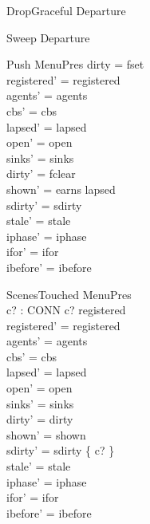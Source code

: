 \documentclass[a4paper,10pt,fleqn]{article}
\begin{document}
\begin{zed}
  DropGraceful  Departure
\end{zed}

\begin{zed}
  Sweep  Departure 
\end{zed}

\begin{schema}{Push}
  \Delta MenuPres
\where
  dirty = fset \\
  registered' = registered \\
  agents' = agents \\
  cbs' = cbs \\
  lapsed' = lapsed \\
  open' = open \\
  sinks' = sinks \\
  dirty' = fclear \\
  shown' = earns \setminus lapsed \\
  sdirty' = sdirty \\
  stale' = stale \\
  iphase' = iphase \\
  ifor' = ifor \\
  ibefore' = ibefore
\end{schema}

\begin{schema}{ScenesTouched}
  \Delta MenuPres \\
  c? : CONN
\where
  c? \in registered \\
  registered' = registered \\
  agents' = agents \\
  cbs' = cbs \\
  lapsed' = lapsed \\
  open' = open \\
  sinks' = sinks \\
  dirty' = dirty \\
  shown' = shown \\
  sdirty' = sdirty \cup \{ c? \} \\
  stale' = stale \\
  iphase' = iphase \\
  ifor' = ifor \\
  ibefore' = ibefore
\end{schema}
\end{document}
